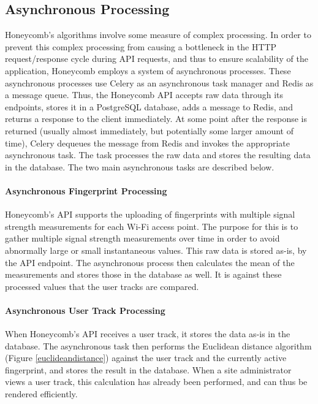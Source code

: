 		
\subsection{Asynchronous Processing}
%


Honeycomb's algorithms involve some measure of complex processing. In order to prevent this complex processing from causing a bottleneck in the HTTP request/response cycle during API requests, and thus to ensure scalability of the application, Honeycomb employs a system of asynchronous processes. These asynchronous processes use Celery \cite{celery} as an asynchronous task manager and Redis \cite{redis} as a message queue. Thus, the Honeycomb API accepts raw data through its endpoints, stores it in a PostgreSQL \cite{postgresql} database, adds a message to Redis, and returns a response to the client immediately. At some point after the response is returned (usually almost immediately, but potentially some larger amount of time), Celery dequeues the message from Redis and invokes the appropriate asynchronous task. The task processes the raw data and stores the resulting data in the database. The two main asynchronous tasks are described below.


\paragraph{Asynchronous Fingerprint Processing}


Honeycomb's API supports the uploading of fingerprints with multiple signal strength measurements for each Wi-Fi access point. The purpose for this is to gather multiple signal strength measurements over time in order to avoid abnormally large or small instantaneous values. This raw data is stored as-is, by the API endpoint. The asynchronous process then calculates the mean of the measurements \cite{turner2011empirical} and stores those in the database as well. It is against these processed values that the user tracks are compared.


\paragraph{Asynchronous User Track Processing}


When Honeycomb's API receives a user track, it stores the data as-is in the database. The asynchronous task then performs the Euclidean distance algorithm (Figure \ref{euclideandistance}) against the user track and the currently active fingerprint, and stores the result in the database. When a site administrator views a user track, this calculation has already been performed, and can thus be rendered efficiently.
	


